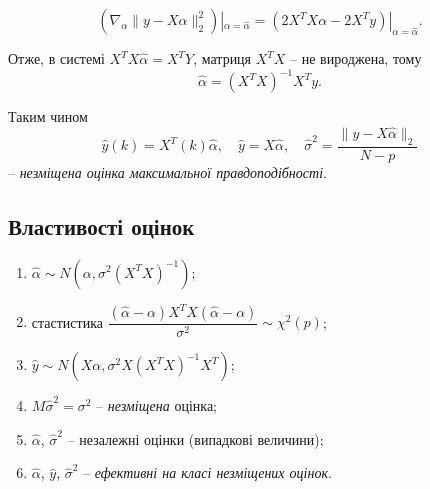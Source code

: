 \[(\nabla_\alpha\|y-X\alpha\|_2^2)|_{\alpha=\widehat{\alpha}} = (2X^TX\alpha-2X^Ty)|_{\alpha=\widehat{\alpha}}. \]

Отже, в системі $X^TX\widehat{\alpha}=X^TY$, матриця $X^TX$ -- не вироджена, тому \[ \widehat{\alpha} = (X^TX)^{-1}X^Ty. \]

Таким чином \[\widehat{y}(k) = X^T(k)\widehat{\alpha}, \quad \widehat{y} = X\widehat{\alpha}, \quad \widehat{\sigma}^2 = \dfrac{\|y-X\widehat{\alpha}\|_2}{N-p}\] -- \textit{незміщена оцінка максимальної правдоподібності}.

\subsection{Властивості оцінок}

\begin{enumerate}
	\item $\widehat{\alpha} \sim N(\alpha, \sigma^2(X^TX)^{-1})$;

	\item стастистика $\dfrac{(\widehat{\alpha}-\alpha)X^TX(\widehat{\alpha}-\alpha)}{\sigma^2} \sim \chi^2(p)$;

	\item $\widehat{y} \sim N(X\alpha, \sigma^2 X(X^TX)^{-1}X^T)$;

	\item $M\widehat{\sigma}^2 = \sigma^2$ -- \textit{незміщена} оцінка;

	\item $\widehat{\alpha}$, $\widehat{\sigma}^2$ -- незалежні оцінки (випадкові величини);

	\item $\widehat{\alpha}$, $\widehat{y}$, $\widehat{\sigma}^2$ -- \textit{ефективні на класі незміщених оцінок}.
\end{enumerate}

